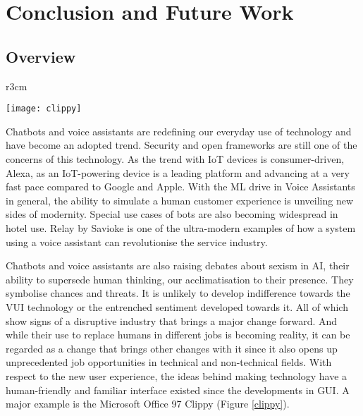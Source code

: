 \chapter{Conclusion and Future Work}
\label{conclusion}
\section{Overview} %



\begin{wrapfigure}{r}{3cm}
	\caption[Clippy as an Early Chatbot] {Microsoft Office Clippy as an early attempt for an interactive Chatbot}
	\label{clippy}
	\texttt{[image: clippy]} 
\end{wrapfigure}


Chatbots and voice assistants are redefining our everyday use of technology and have become an adopted trend. Security and open frameworks are still one of the concerns of this technology. %
As the trend with IoT devices is consumer-driven, Alexa, as an IoT-powering device is a leading platform and advancing at a very fast pace compared to Google and Apple. %
With the ML drive in Voice Assistants in general, the ability to simulate a human customer experience is unveiling new sides of modernity. %
Special use cases of bots are also becoming widespread in hotel use. Relay by Savioke is one of the ultra-modern examples of how a system using a voice assistant can revolutionise the service industry. %



Chatbots and voice assistants are also raising debates about sexism in AI, their ability to supersede human thinking, our acclimatisation to their presence. They symbolise chances and threats. It is unlikely to develop indifference towards the VUI technology or the entrenched sentiment developed towards it. All of which show signs of a disruptive industry that brings a major change forward. And while their use to replace humans in different jobs is becoming reality, it can be regarded as a change that brings other changes with it since it also opens up unprecedented job opportunities in technical and non-technical fields. %
With respect to the new user experience, the ideas behind making technology have a human-friendly and familiar interface existed since the developments in GUI. A major example is the Microsoft Office 97 Clippy (Figure \ref{clippy}).  %

